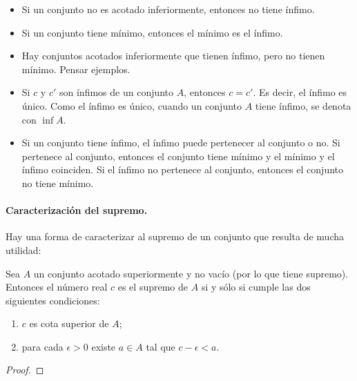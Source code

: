 \begin{itemize}
    \item Si un conjunto no es acotado inferiormente, entonces no tiene ínfimo.
    \item Si un conjunto tiene mínimo, entonces el mínimo es el ínfimo.
    \item Hay conjuntos acotados inferiormente que tienen ínfimo, pero no tienen mínimo. Pensar ejemplos.
    \item Si $c$ y $c'$ son ínfimos de un conjunto $A$, entonces $c=c'$. Es decir, el ínfimo es único.
    Como el ínfimo es único, cuando un conjunto $A$ tiene ínfimo, se denota con $\inf A$.
    \item Si un conjunto tiene ínfimo, el ínfimo puede pertenecer al conjunto o no. Si pertenece al conjunto, entonces el conjunto tiene mínimo y el mínimo y el ínfimo coinciden. Si el ínfimo no pertenece al conjunto, entonces el conjunto no tiene mínimo.
\end{itemize}


\paragraph{Caracterización del supremo.} Hay una forma de caracterizar al supremo de un conjunto que resulta de mucha utilidad:

\begin{proposition}\label{P:supremo-caracterizacion}
    Sea $A$ un conjunto acotado superiormente y no vacío (por lo que tiene supremo).
    Entonces el número real $c$ es el supremo de $A$ si y sólo si cumple las dos siguientes condiciones:
    \begin{enumerate}[{\rm(i)}]
        \item $c$ es cota superior de $A$;
        \item para cada $\epsilon >0$ existe $a\in A$ tal que $c-\epsilon < a$.
    \end{enumerate}
\end{proposition}

\begin{proof}
{}



\end{proof}


